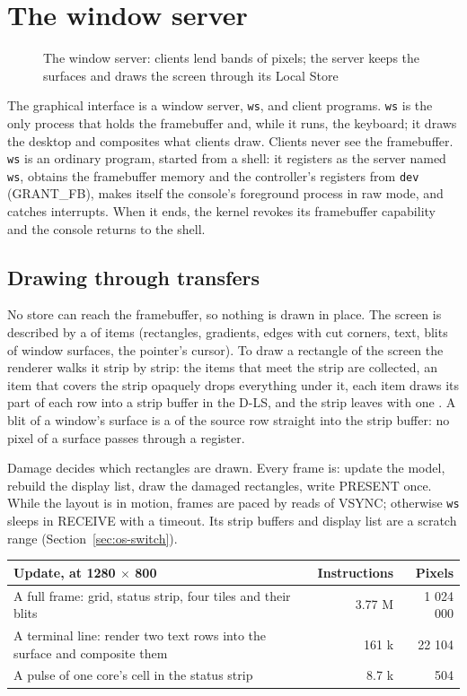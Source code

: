 \section{The window server}\label{sec:os-ws}

\begin{figure}[htbp]
\centering

\caption{The window server: clients lend bands of pixels; the server keeps the surfaces and draws the screen through its Local Store}\label{fig:os-ws}
\end{figure}


The graphical interface is a window server, \texttt{ws}, and client programs. \texttt{ws} is the only
process that holds the framebuffer and, while it runs, the keyboard; it draws the desktop and
composites what clients draw. Clients never see the framebuffer. \texttt{ws} is an ordinary program,
started from a shell: it registers as the server named \texttt{ws}, obtains the framebuffer memory and
the controller's registers from \texttt{dev} (GRANT\_FB), makes itself the console's foreground process
in raw mode, and catches interrupts. When it ends, the kernel revokes its framebuffer capability and
the console returns to the shell.

\subsection{Drawing through transfers}
No store can reach the framebuffer, so nothing is drawn in place. The screen is described by a
 of items (rectangles, gradients, edges with cut corners, text, blits of window
surfaces, the pointer's cursor). To draw a rectangle of the screen the renderer walks it strip by strip: the items that meet
the strip are collected, an item that covers the strip opaquely drops everything under it, each item
draws its part of each row into a strip buffer in the D-LS, and the strip leaves with one .
A blit of a window's surface is a  of the source row straight into the strip buffer: no
pixel of a surface passes through a register.

Damage decides which rectangles are drawn. Every frame is: update the model, rebuild the display list,
draw the damaged rectangles, write PRESENT once. While the layout is in motion, frames are paced by
reads of VSYNC; otherwise \texttt{ws} sleeps in RECEIVE with a timeout. Its strip buffers and display
list are a scratch range (Section~\ref{sec:os-switch}).

\begin{center}\small
\begin{tabular}{@{}l r r@{}}
\toprule
\textbf{Update, at 1280 $\times$ 800} & \textbf{Instructions} & \textbf{Pixels}\\\midrule
A full frame: grid, status strip, four tiles and their blits & 3.77 M & 1 024 000\\
A terminal line: render two text rows into the surface and composite them & 161 k & 22 104\\
A pulse of one core's cell in the status strip & 8.7 k & 504\\
\bottomrule
\end{tabular}
\end{center}

